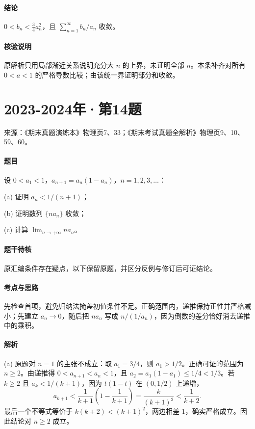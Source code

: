 \documentclass[UTF8,fontset=fandol,12pt,oneside,openany]{ctexrep}
\theoremstyle{definition}
\begin{document}
\paragraph{结论}
$0<b_n<\frac34a_n^2$，且 $\sum_{n=1}^{\infty}b_n/a_n$ 收敛。

\paragraph{核验说明}
原解析只用局部渐近关系说明充分大 $n$ 的上界，未证明全部 $n$。本条补齐对所有 $0<a<1$ 的严格导数比较；由该统一界证明部分和收敛。

\par\addvspace{18pt}\noindent\begin{minipage}{\linewidth}
\section{2023-2024年·第14题}
\noindent 来源：《期末真题演练本》物理页7、33；《期末考试真题全解析》物理页9、10、59、60。

\paragraph{题目}
设 $0<a_1<1$，$a_{n+1}=a_n(1-a_n)$，$n=1,2,3,\ldots$：

(a) 证明 $a_n<1/(n+1)$；

(b) 证明数列 $\{na_n\}$ 收敛；

(c) 计算 $\lim_{n\to+\infty}na_n$。

\paragraph{题干待核} 原汇编条件存在疑点，以下保留原题，并区分反例与修订后可证结论。
\end{minipage}\par
\paragraph{考点与思路}
先检查首项，避免归纳法掩盖初值条件不足。正确范围内，递推保持正性并严格减小；先建立 $a_n\to0$，随后把 $na_n$ 写成 $n/(1/a_n)$，因为倒数的差分恰好消去递推中的乘积。

\paragraph{解析}
(a) 原题对 $n=1$ 的主张不成立：取 $a_1=3/4$，则 $a_1>1/2$。正确可证的范围为 $n\ge2$。由递推得 $0<a_{n+1}<a_n<1$，且 $a_2=a_1(1-a_1)\le1/4<1/3$。若 $k\ge2$ 且 $a_k<1/(k+1)$，因为 $t(1-t)$ 在 $(0,1/2)$ 上递增，\[
a_{k+1}<\frac1{k+1}\left(1-\frac1{k+1}\right)=\frac{k}{(k+1)^2}<\frac1{k+2}.
\]最后一个不等式等价于 $k(k+2)<(k+1)^2$，两边相差 $1$，确实严格成立。因此结论对 $n\ge2$ 成立。
\end{document}
